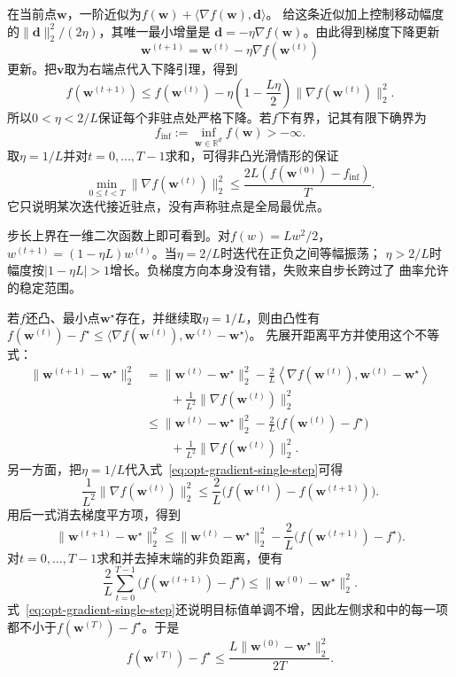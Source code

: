 在当前点$\bm w$，一阶近似为$f(\bm w)+\langle\nabla f(\bm w),\bm d\rangle$。
给这条近似加上控制移动幅度的$\|\bm d\|_2^2/(2\eta)$，其唯一最小增量是
$\bm d=-\eta\nabla f(\bm w)$。由此得到梯度下降更新
\begin{equation}
  \bm{w}^{(t+1)}
  =\bm{w}^{(t)}-\eta\nabla f(\bm{w}^{(t)})
  \label{eq:opt-gradient-descent}
\end{equation}
更新。把$\bm{v}$取为右端点代入下降引理，得到
\begin{equation}
  f(\bm{w}^{(t+1)})
  \leq f(\bm{w}^{(t)})
  -\eta\left(1-\frac{L\eta}{2}\right)
  \lVert\nabla f(\bm{w}^{(t)})\rVert_2^2.
  \label{eq:opt-gradient-single-step}
\end{equation}
所以$0<\eta<2/L$保证每个非驻点处严格下降。若$f$下有界，记其有限下确界为
\[
  f_{\inf}:=\inf_{\bm{w}\in\mathbb{R}^d}f(\bm{w})>-\infty.
\]
取$\eta=1/L$并对$t=0,\ldots,T-1$求和，可得非凸光滑情形的保证
\begin{equation}
  \min_{0\leq t<T}\lVert\nabla f(\bm{w}^{(t)})\rVert_2^2
  \leq
  \frac{2L(f(\bm{w}^{(0)})-f_{\inf})}{T}.
  \label{eq:opt-nonconvex-gradient-rate}
\end{equation}
它只说明某次迭代接近驻点，没有声称驻点是全局最优点。

步长上界在一维二次函数上即可看到。对$f(w)=Lw^2/2$，
$w^{(t+1)}=(1-\eta L)w^{(t)}$。当$\eta=2/L$时迭代在正负之间等幅振荡；
$\eta>2/L$时幅度按$|1-\eta L|>1$增长。负梯度方向本身没有错，失败来自步长跨过了
曲率允许的稳定范围。

若$f$还凸、最小点$\bm{w}^{\star}$存在，并继续取$\eta=1/L$，则由凸性有
$f(\bm{w}^{(t)})-f^\star
\leq\langle\nabla f(\bm{w}^{(t)}),\bm{w}^{(t)}-\bm{w}^{\star}\rangle$。
先展开距离平方并使用这个不等式：
\begin{align*}
  \lVert\bm{w}^{(t+1)}-\bm{w}^{\star}\rVert_2^2
  &=
  \lVert\bm{w}^{(t)}-\bm{w}^{\star}\rVert_2^2
  -\frac{2}{L}
  \left\langle\nabla f(\bm{w}^{(t)}),
  \bm{w}^{(t)}-\bm{w}^{\star}\right\rangle\\
  &\qquad
  +\frac{1}{L^2}\lVert\nabla f(\bm{w}^{(t)})\rVert_2^2\\
  &\leq
  \lVert\bm{w}^{(t)}-\bm{w}^{\star}\rVert_2^2
  -\frac{2}{L}\bigl(f(\bm{w}^{(t)})-f^\star\bigr)\\
  &\qquad
  +\frac{1}{L^2}\lVert\nabla f(\bm{w}^{(t)})\rVert_2^2.
\end{align*}
另一方面，把$\eta=1/L$代入式~\eqref{eq:opt-gradient-single-step}可得
\[
  \frac{1}{L^2}\lVert\nabla f(\bm{w}^{(t)})\rVert_2^2
  \leq
  \frac{2}{L}\bigl(
  f(\bm{w}^{(t)})-f(\bm{w}^{(t+1)})\bigr).
\]
用后一式消去梯度平方项，得到
\[
  \lVert\bm{w}^{(t+1)}-\bm{w}^{\star}\rVert_2^2
  \leq
  \lVert\bm{w}^{(t)}-\bm{w}^{\star}\rVert_2^2
  -\frac{2}{L}\bigl(f(\bm{w}^{(t+1)})-f^\star\bigr).
\]
对$t=0,\ldots,T-1$求和并去掉末端的非负距离，便有
\[
  \frac{2}{L}\sum_{t=0}^{T-1}
  \bigl(f(\bm{w}^{(t+1)})-f^\star\bigr)
  \leq
  \lVert\bm{w}^{(0)}-\bm{w}^{\star}\rVert_2^2.
\]
式~\eqref{eq:opt-gradient-single-step}还说明目标值单调不增，因此左侧求和中的每一项
都不小于$f(\bm{w}^{(T)})-f^\star$。于是
\begin{equation}
  f(\bm{w}^{(T)})-f^\star
  \leq\frac{L\lVert\bm{w}^{(0)}-\bm{w}^{\star}\rVert_2^2}{2T}.
  \label{eq:opt-convex-gradient-rate}
\end{equation}


